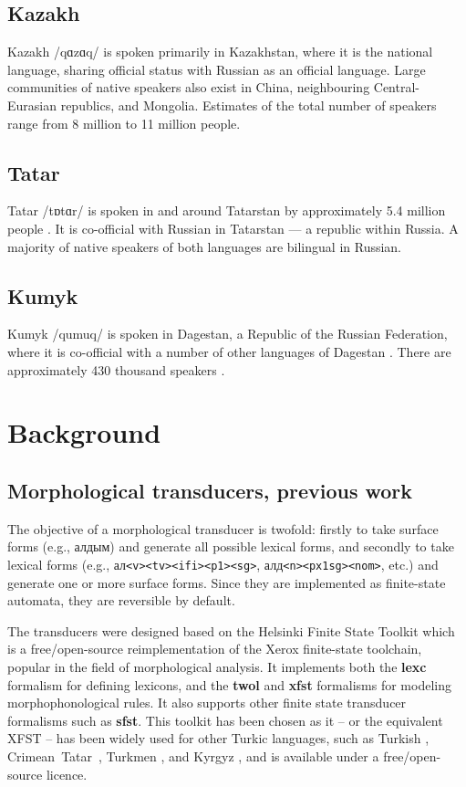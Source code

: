 \documentclass[a4paper,11pt,twocolumn]{article}
\begin{document}
\subsection{Kazakh}
Kazakh /q{\symbl ɑ}z{\symbl ɑ}q/ is spoken primarily in Kazakhstan, where it is the national language, sharing official status with Russian as an official language.  Large communities of native speakers also exist in China, neighbouring Central-Eurasian republics, and Mongolia.  Estimates of the total number of speakers range from 8 million \citep{ethnologue} to 11 million \citep{nationalencyklopedin} people.

\subsection{Tatar}
Tatar /t{\symbl ɒ}t{\symbl ɑ}r/ is spoken in and around Tatarstan by approximately 5.4 million people \citep{ethnologue}.  It is co-official with Russian in Tatarstan --- a republic within Russia.  A majority of native speakers of both languages are bilingual in Russian. %

\subsection{Kumyk}
Kumyk /qumuq/ is spoken in Dagestan, a Republic of the Russian Federation, where it is co-official with a number of other languages of Dagestan \citep{ethnologue}.  There are approximately 430 thousand speakers \citep{ethnologue}.

\section{Background}
\subsection{Morphological transducers, previous work}
The objective of a morphological transducer is twofold: firstly to take surface forms (e.g., алдым) and generate all possible lexical forms, and secondly to take lexical forms (e.g.,  ал{\tt {\small <v><tv><ifi><p1><sg>}}, алд{\tt {\small <n><px1sg><nom>}}, etc.) and generate one or more surface forms.  Since they are implemented as finite-state automata, they are reversible by default.

The transducers were designed based on the Helsinki Finite State Toolkit \citep{hfst/2011} which is a free/open-source reimplementation of the Xerox finite-state toolchain, popular in the field of morphological analysis.  It implements both the \textbf{lexc} formalism for defining lexicons, and the \textbf{twol} and \textbf{xfst} formalisms for modeling morphophonological rules.  It also supports other finite state transducer formalisms such as \textbf{sfst}.  This toolkit has been chosen as it -- or the equivalent XFST -- has been widely used for other Turkic languages, such as Turkish \citep{coltekin2010}, Crimean~Tatar~\citep{altintas2001}, Turkmen \citep{tantug2006}, and Kyrgyz \citep{washington2012}, and is available under a free/open-source licence.
\end{document}
